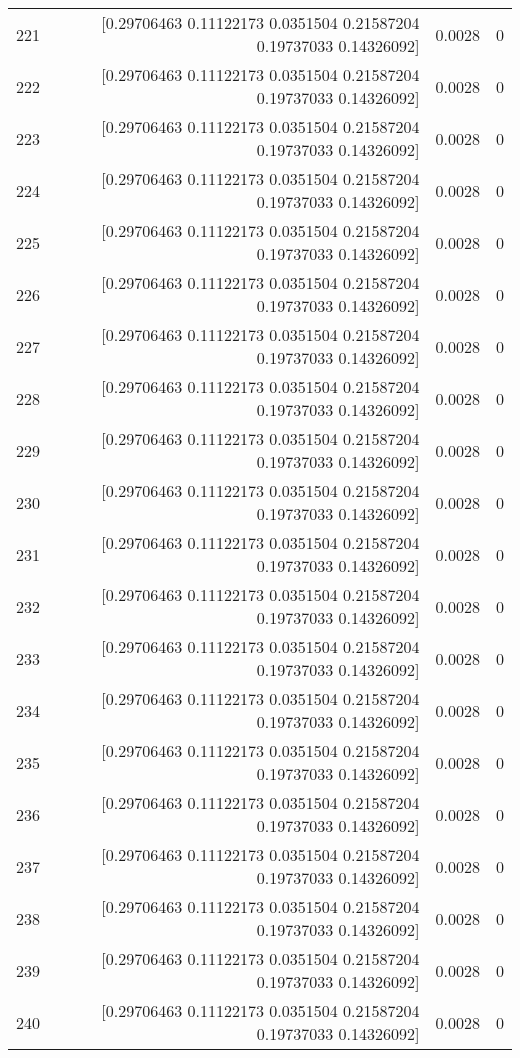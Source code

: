 \begin{longtable}{lrrr}
221 & [0.29706463 0.11122173 0.0351504  0.21587204 0.19737033 0.14326092] & 0.0028 & 0 \\
222 & [0.29706463 0.11122173 0.0351504  0.21587204 0.19737033 0.14326092] & 0.0028 & 0 \\
223 & [0.29706463 0.11122173 0.0351504  0.21587204 0.19737033 0.14326092] & 0.0028 & 0 \\
224 & [0.29706463 0.11122173 0.0351504  0.21587204 0.19737033 0.14326092] & 0.0028 & 0 \\
225 & [0.29706463 0.11122173 0.0351504  0.21587204 0.19737033 0.14326092] & 0.0028 & 0 \\
226 & [0.29706463 0.11122173 0.0351504  0.21587204 0.19737033 0.14326092] & 0.0028 & 0 \\
227 & [0.29706463 0.11122173 0.0351504  0.21587204 0.19737033 0.14326092] & 0.0028 & 0 \\
228 & [0.29706463 0.11122173 0.0351504  0.21587204 0.19737033 0.14326092] & 0.0028 & 0 \\
229 & [0.29706463 0.11122173 0.0351504  0.21587204 0.19737033 0.14326092] & 0.0028 & 0 \\
230 & [0.29706463 0.11122173 0.0351504  0.21587204 0.19737033 0.14326092] & 0.0028 & 0 \\
231 & [0.29706463 0.11122173 0.0351504  0.21587204 0.19737033 0.14326092] & 0.0028 & 0 \\
232 & [0.29706463 0.11122173 0.0351504  0.21587204 0.19737033 0.14326092] & 0.0028 & 0 \\
233 & [0.29706463 0.11122173 0.0351504  0.21587204 0.19737033 0.14326092] & 0.0028 & 0 \\
234 & [0.29706463 0.11122173 0.0351504  0.21587204 0.19737033 0.14326092] & 0.0028 & 0 \\
235 & [0.29706463 0.11122173 0.0351504  0.21587204 0.19737033 0.14326092] & 0.0028 & 0 \\
236 & [0.29706463 0.11122173 0.0351504  0.21587204 0.19737033 0.14326092] & 0.0028 & 0 \\
237 & [0.29706463 0.11122173 0.0351504  0.21587204 0.19737033 0.14326092] & 0.0028 & 0 \\
238 & [0.29706463 0.11122173 0.0351504  0.21587204 0.19737033 0.14326092] & 0.0028 & 0 \\
239 & [0.29706463 0.11122173 0.0351504  0.21587204 0.19737033 0.14326092] & 0.0028 & 0 \\
240 & [0.29706463 0.11122173 0.0351504  0.21587204 0.19737033 0.14326092] & 0.0028 & 0 \\

\end{longtable}
